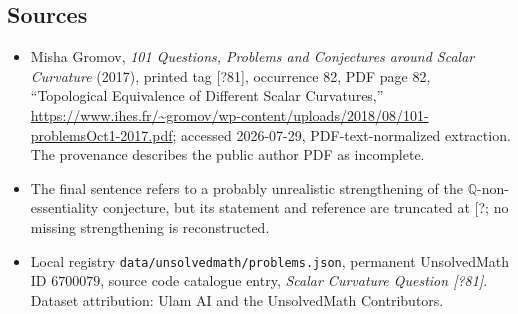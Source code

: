 \documentclass[11pt]{article}
\begin{document}
\subsection{Sources}
\begin{itemize}
\item Misha Gromov, \emph{101 Questions, Problems and Conjectures around Scalar Curvature} (2017), printed tag [?81], occurrence 82, PDF page 82, ``Topological Equivalence of Different Scalar Curvatures,'' \url{https://www.ihes.fr/~gromov/wp-content/uploads/2018/08/101-problemsOct1-2017.pdf}; accessed 2026-07-29, PDF-text-normalized extraction. The provenance describes the public author PDF as incomplete.
\item The final sentence refers to a probably unrealistic strengthening of the $\mathbb Q$-non-essentiality conjecture, but its statement and reference are truncated at [?; no missing strengthening is reconstructed.
\item Local registry \texttt{data/unsolvedmath/problems.json}, permanent UnsolvedMath ID $6700079$, source code catalogue entry, \emph{Scalar Curvature Question [?81]}. Dataset attribution: Ulam AI and the UnsolvedMath Contributors.
\end{itemize}
\end{document}

